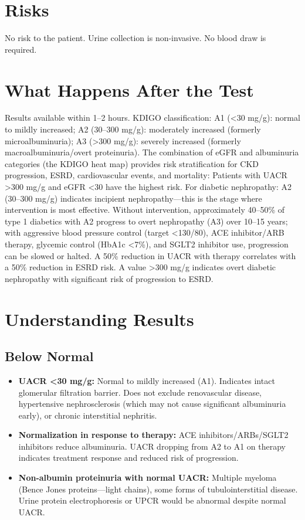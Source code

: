 \section*{Risks}
No risk to the patient. Urine collection is non-invasive. No blood draw is required.

\section*{What Happens After the Test}
Results available within 1--2 hours. KDIGO classification: A1 (<30 mg/g): normal to mildly increased; A2 (30--300 mg/g): moderately increased (formerly microalbuminuria); A3 (>300 mg/g): severely increased (formerly macroalbuminuria/overt proteinuria). The combination of eGFR and albuminuria categories (the KDIGO heat map) provides risk stratification for CKD progression, ESRD, cardiovascular events, and mortality: Patients with UACR >300 mg/g and eGFR <30 have the highest risk. For diabetic nephropathy: A2 (30--300 mg/g) indicates incipient nephropathy---this is the stage where intervention is most effective. Without intervention, approximately 40--50\% of type 1 diabetics with A2 progress to overt nephropathy (A3) over 10--15 years; with aggressive blood pressure control (target <130/80), ACE inhibitor/ARB therapy, glycemic control (HbA1c <7\%), and SGLT2 inhibitor use, progression can be slowed or halted. A 50\% reduction in UACR with therapy correlates with a 50\% reduction in ESRD risk. A value >300 mg/g indicates overt diabetic nephropathy with significant risk of progression to ESRD.

\section*{Understanding Results}

\subsection*{Below Normal}
\begin{itemize}
  \item \textbf{UACR <30 mg/g:} Normal to mildly increased (A1). Indicates intact glomerular filtration barrier. Does not exclude renovascular disease, hypertensive nephrosclerosis (which may not cause significant albuminuria early), or chronic interstitial nephritis.
  \item \textbf{Normalization in response to therapy:} ACE inhibitors/ARBs/SGLT2 inhibitors reduce albuminuria. UACR dropping from A2 to A1 on therapy indicates treatment response and reduced risk of progression.
  \item \textbf{Non-albumin proteinuria with normal UACR:} Multiple myeloma (Bence Jones proteins---light chains), some forms of tubulointerstitial disease. Urine protein electrophoresis or UPCR would be abnormal despite normal UACR.
\end{itemize}

